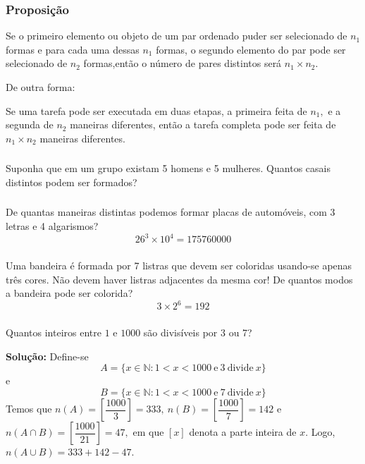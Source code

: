 \documentclass[14pt,aspectratio=1610]{beamer}
\begin{document}
\begin{frame}{}
\frametitle{Proposição}
\begin{block}{}
\justifying
Se o primeiro elemento ou objeto de um par ordenado puder ser selecionado de $n_1$ formas e para cada uma dessas $n_1$ formas, o segundo elemento do par pode ser selecionado de $n_2$ formas,então o número de pares distintos será $n_1\times n_2.$
\end{block}\pause
De outra forma:
\begin{block}{}
\justifying
Se uma tarefa pode ser executada em duas etapas, a primeira feita de $n_1,$ e a segunda de $n_2$ maneiras diferentes, então a tarefa completa pode ser feita de $n_1\times n_2$ maneiras diferentes.
\end{block}
\end{frame}

\begin{frame}{}
\frametitle{}
\begin{block}{}
\justifying
Suponha que em um grupo existam 5 homens e 5 mulheres. Quantos casais distintos podem ser formados?
\end{block}
\end{frame}

\begin{frame}{}
\frametitle{}
\begin{block}{}
\justifying
De quantas maneiras distintas podemos formar placas de automóveis, com 3 letras e 4 algarismos? \pause
$$26^{3}\times 10^{4}=175760000$$
\end{block}
\end{frame}

\begin{frame}{}
\frametitle{}
\begin{block}{}
\justifying
Uma bandeira é formada por 7 listras que devem ser coloridas usando-se apenas três cores. Não devem haver listras adjacentes da mesma cor! De quantos modos a bandeira pode ser colorida?\pause
$$3\times 2^{6}=192$$
\end{block}
\end{frame}

\begin{frame}{}
\frametitle{}
\begin{block}{}
\justifying
Quantos inteiros entre $1$ e $1000$ são divisíveis por 3 ou 7?\pause

{\bf Solução:} Define-se 
$$A=\{x\in \mathds{N}: 1<x<1000\ \textrm{e}\ 3\ \textrm{divide}\ x\}$$
e
$$B=\{x\in \mathds{N}: 1<x<1000\ \textrm{e}\ 7\ \textrm{divide}\ x\}$$
Temos que $n(A)=\left[\dfrac{1000}{3}\right]=333,\ n(B)=\left[\dfrac{1000}{7}\right]=142$ e $n(A\cap B)=\left[\dfrac{1000}{21}\right]=47,$ em que $[x]$ denota a parte inteira de $x.$ Logo, $n(A\cup B)=333+142-47.$
\end{block}
\end{frame}
\end{document}
